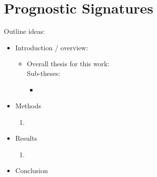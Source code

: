 \documentclass[thesis.tex]{subfiles}
\begin{document}
\chapter{Prognostic Signatures}
\label{ch:prognostic}

Outline ideas:
\begin{itemize}
  \item Introduction / overview:
  \begin{itemize}
    \item Overall thesis for this work: \\
    Sub-theses:
    \begin{itemize}
      \item
    \end{itemize}
  \end{itemize}
  
  \item Methods
  \begin{enumerate}
    \item
  \end{enumerate}
  
  \item Results
  \begin{enumerate}
    \item
  \end{enumerate}

  \item Conclusion
  
\end{itemize}
\end{document}

